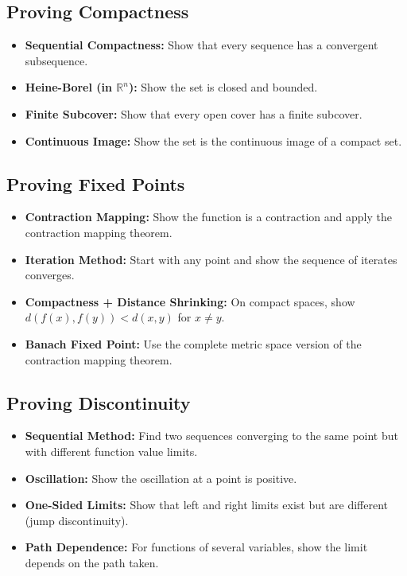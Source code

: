 \subsection*{Proving Compactness}

\begin{itemize}
\item \textbf{Sequential Compactness:} Show that every sequence has a convergent subsequence.

\item \textbf{Heine-Borel (in $\mathbb{R}^n$):} Show the set is closed and bounded.

\item \textbf{Finite Subcover:} Show that every open cover has a finite subcover.

\item \textbf{Continuous Image:} Show the set is the continuous image of a compact set.
\end{itemize}

\subsection*{Proving Fixed Points}

\begin{itemize}
\item \textbf{Contraction Mapping:} Show the function is a contraction and apply the contraction mapping theorem.

\item \textbf{Iteration Method:} Start with any point and show the sequence of iterates converges.

\item \textbf{Compactness + Distance Shrinking:} On compact spaces, show $d(f(x), f(y)) < d(x,y)$ for $x \neq y$.

\item \textbf{Banach Fixed Point:} Use the complete metric space version of the contraction mapping theorem.
\end{itemize}

\subsection*{Proving Discontinuity}

\begin{itemize}
\item \textbf{Sequential Method:} Find two sequences converging to the same point but with different function value limits.

\item \textbf{Oscillation:} Show the oscillation at a point is positive.

\item \textbf{One-Sided Limits:} Show that left and right limits exist but are different (jump discontinuity).

\item \textbf{Path Dependence:} For functions of several variables, show the limit depends on the path taken.
\end{itemize}

